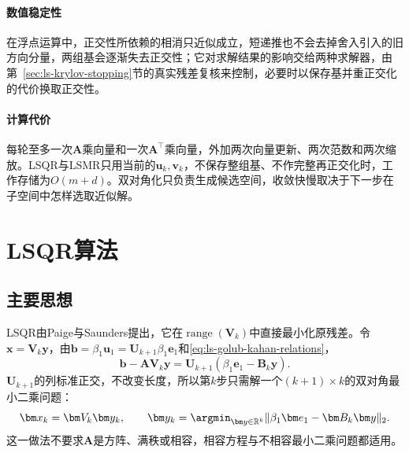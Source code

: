 \paragraph{数值稳定性}
在浮点运算中，正交性所依赖的相消只近似成立，短递推也不会去掉舍入引入的旧方向分量，两组基会逐渐失去正交性；它对求解结果的影响交给两种求解器，由第~\ref{sec:ls-krylov-stopping}节的真实残差复核来控制，必要时以保存基并重正交化的代价换取正交性。

\paragraph{计算代价}
每轮至多一次$\bm A$乘向量和一次$\bm A^\top$乘向量，外加两次向量更新、两次范数和两次缩放。LSQR与LSMR只用当前的$\bm u_k,\bm v_k$，不保存整组基、不作完整再正交化时，工作存储为$O(m+d)$。双对角化只负责生成候选空间，收敛快慢取决于下一步在子空间中怎样选取近似解。

\section{LSQR算法}
\label{sec:ls-lsqr}

\subsection{主要思想}

LSQR由Paige与Saunders提出，它在$\operatorname{range}(\bm V_k)$中直接最小化原残差。令$\bm x=\bm V_k\bm y$，由$\bm b=\beta_1\bm u_1=\bm U_{k+1}\beta_1\bm e_1$和\eqref{eq:ls-golub-kahan-relations}，
\[
 \bm b-\bm A\bm V_k\bm y=\bm U_{k+1}(\beta_1\bm e_1-\bm B_k\bm y).
\]
$\bm U_{k+1}$的列标准正交，不改变长度，所以第$k$步只需解一个$(k+1)\times k$的双对角最小二乘问题：
\begin{equation}
 \bm x_k=\bm V_k\bm y_k,\qquad
 \bm y_k=\argmin_{\bm y\in\mathbb R^k}\lVert\beta_1\bm e_1-\bm B_k\bm y\rVert_2 .
 \label{eq:ls-lsqr-subproblem}
\end{equation}
这一做法不要求$\bm A$是方阵、满秩或相容，相容方程与不相容最小二乘问题都适用。

